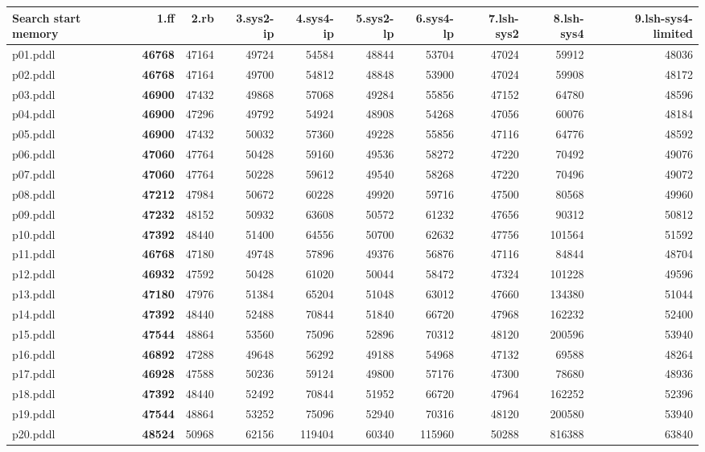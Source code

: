 \documentclass{article}
\begin{document}
\begin{tabular}{@{}lrrrrrrrrr@{}}
Search start memory & 1.ff & 2.rb & 3.sys2-ip & 4.sys4-ip & 5.sys2-lp & 6.sys4-lp & 7.lsh-sys2 & 8.lsh-sys4 & 9.lsh-sys4-limited \\
\midrule
p01.pddl & \textbf{46768} & 47164 & 49724 & 54584 & 48844 & 53704 & 47024 & 59912 & 48036 \\
p02.pddl & \textbf{46768} & 47164 & 49700 & 54812 & 48848 & 53900 & 47024 & 59908 & 48172 \\
p03.pddl & \textbf{46900} & 47432 & 49868 & 57068 & 49284 & 55856 & 47152 & 64780 & 48596 \\
p04.pddl & \textbf{46900} & 47296 & 49792 & 54924 & 48908 & 54268 & 47056 & 60076 & 48184 \\
p05.pddl & \textbf{46900} & 47432 & 50032 & 57360 & 49228 & 55856 & 47116 & 64776 & 48592 \\
p06.pddl & \textbf{47060} & 47764 & 50428 & 59160 & 49536 & 58272 & 47220 & 70492 & 49076 \\
p07.pddl & \textbf{47060} & 47764 & 50228 & 59612 & 49540 & 58268 & 47220 & 70496 & 49072 \\
p08.pddl & \textbf{47212} & 47984 & 50672 & 60228 & 49920 & 59716 & 47500 & 80568 & 49960 \\
p09.pddl & \textbf{47232} & 48152 & 50932 & 63608 & 50572 & 61232 & 47656 & 90312 & 50812 \\
p10.pddl & \textbf{47392} & 48440 & 51400 & 64556 & 50700 & 62632 & 47756 & 101564 & 51592 \\
p11.pddl & \textbf{46768} & 47180 & 49748 & 57896 & 49376 & 56876 & 47116 & 84844 & 48704 \\
p12.pddl & \textbf{46932} & 47592 & 50428 & 61020 & 50044 & 58472 & 47324 & 101228 & 49596 \\
p13.pddl & \textbf{47180} & 47976 & 51384 & 65204 & 51048 & 63012 & 47660 & 134380 & 51044 \\
p14.pddl & \textbf{47392} & 48440 & 52488 & 70844 & 51840 & 66720 & 47968 & 162232 & 52400 \\
p15.pddl & \textbf{47544} & 48864 & 53560 & 75096 & 52896 & 70312 & 48120 & 200596 & 53940 \\
p16.pddl & \textbf{46892} & 47288 & 49648 & 56292 & 49188 & 54968 & 47132 & 69588 & 48264 \\
p17.pddl & \textbf{46928} & 47588 & 50236 & 59124 & 49800 & 57176 & 47300 & 78680 & 48936 \\
p18.pddl & \textbf{47392} & 48440 & 52492 & 70844 & 51952 & 66720 & 47964 & 162252 & 52396 \\
p19.pddl & \textbf{47544} & 48864 & 53252 & 75096 & 52940 & 70316 & 48120 & 200580 & 53940 \\
p20.pddl & \textbf{48524} & 50968 & 62156 & 119404 & 60340 & 115960 & 50288 & 816388 & 63840 \\
\end{tabular}
\end{document}
